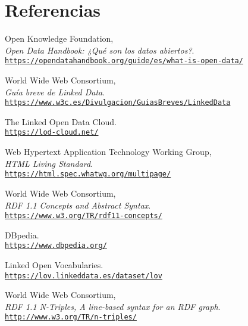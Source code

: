 \section{Referencias}

\begingroup
    \renewcommand{\section}[2]{}%
    \begin{thebibliography}{X}
    
            Open Knowledge Foundation,
            \\ \textit{Open Data Handbook: ¿Qué son los datos abiertos?}.
            \\ \texttt{\url{https://opendatahandbook.org/guide/es/what-is-open-data/}}
            
            World Wide Web Consortium,
            \\ \textit{Guía breve de Linked Data}.
            \\ \texttt{\url{https://www.w3c.es/Divulgacion/GuiasBreves/LinkedData}}
            
            The Linked Open Data Cloud.
            \\ \texttt{\url{https://lod-cloud.net/}}
            
            Web Hypertext Application Technology Working Group,
            \\ \textit{HTML Living Standard}.
            \\ \texttt{\url{https://html.spec.whatwg.org/multipage/}}
            
            World Wide Web Consortium,
            \\ \textit{RDF 1.1 Concepts and Abstract Syntax}.
            \\ \texttt{\url{https://www.w3.org/TR/rdf11-concepts/}}
        
            DBpedia.
            \\ \texttt{\url{https://www.dbpedia.org/}}
        
            Linked Open Vocabularies.
            \\ \texttt{\url{https://lov.linkeddata.es/dataset/lov}}
        
            World Wide Web Consortium,
            \\ \textit{RDF 1.1 N-Triples, A line-based syntax for an RDF graph}.
            \\ \texttt{\url{http://www.w3.org/TR/n-triples/}}
        

\end{thebibliography}
